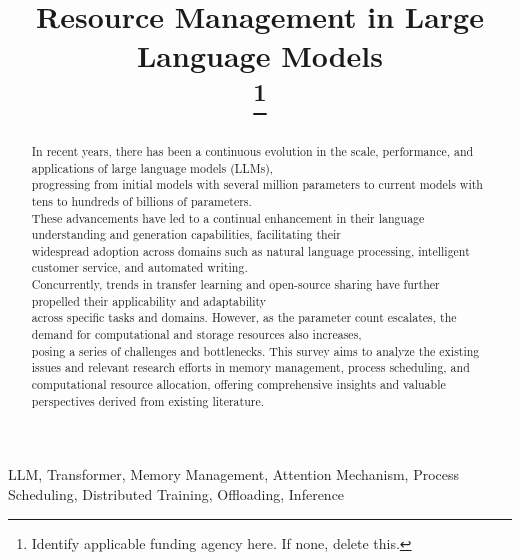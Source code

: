 \documentclass[conference]{IEEEtran}
\begin{document}
\title{Resource Management in Large Language Models\\
    \thanks{Identify applicable funding agency here. If none, delete this.}
}

\author{
    \and
    \and
}

\maketitle

\begin{abstract}
    In recent years, there has been a continuous evolution in the scale, performance, and applications of large language models (LLMs),\\
    progressing from initial models with several million parameters to current models with tens to hundreds of billions of parameters. \\
    These advancements have led to a continual enhancement in their language understanding and generation capabilities, facilitating their \\
    widespread adoption across domains such as natural language processing, intelligent customer service, and automated writing. \\
    Concurrently, trends in transfer learning and open-source sharing have further propelled their applicability and adaptability \\
    across specific tasks and domains. However, as the parameter count escalates, the demand for computational and storage resources also increases, \\
    posing a series of challenges and bottlenecks. This survey aims to analyze the existing issues and relevant research efforts in memory management, process scheduling, and computational resource allocation, offering comprehensive insights and valuable perspectives derived from existing literature.
\end{abstract}

\begin{IEEEkeywords}
    LLM, Transformer, Memory Management, Attention Mechanism, Process Scheduling, Distributed Training, Offloading, Inference
\end{IEEEkeywords}
\end{document}
